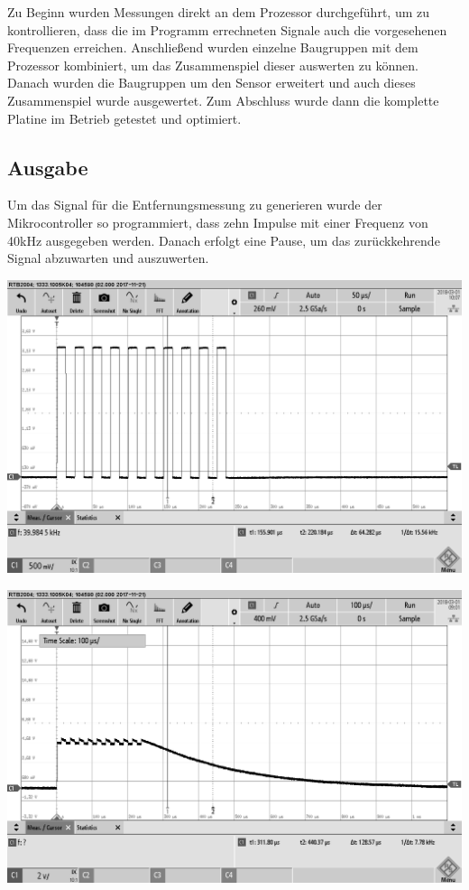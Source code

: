 
Zu Beginn wurden Messungen direkt an dem Prozessor durchgeführt, um zu kontrollieren, dass die im Programm errechneten Signale auch die vorgesehenen Frequenzen erreichen. Anschließend wurden einzelne Baugruppen mit dem Prozessor kombiniert, um das Zusammenspiel dieser auswerten zu können. Danach wurden die Baugruppen um den Sensor erweitert und auch dieses Zusammenspiel wurde ausgewertet. Zum Abschluss wurde dann die komplette Platine im Betrieb getestet und optimiert.

\subsection{Ausgabe}
Um das Signal für die Entfernungsmessung zu generieren wurde der Mikrocontroller so programmiert, dass zehn Impulse mit einer Frequenz von 40kHz ausgegeben werden. Danach erfolgt eine Pause, um das zurückkehrende Signal abzuwarten und auszuwerten.\\
\begin{minipage}{0.5\textwidth}
\includegraphics[width=1\textwidth, draft
]{Abbildungen/MessungenP1/PWM-von-der-cpu.png}
\label{fig:pwm-burst}
\end{minipage}
\begin{minipage}{0.5\textwidth}
\includegraphics[width=1\textwidth, draft
]{Abbildungen/MessungenP1/PWM-ausgabe-mit-Hi-Side.png}
\label{fig:HiSide}
\end{minipage}

